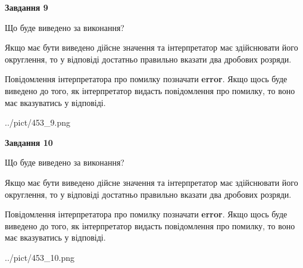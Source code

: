 \documentclass[12pt, ukrainian]{article}
\begin{document}
{\begin {Large}
{\begin {center}\textbf{Завдання 9}\end {center}}\par
Що буде виведено за виконання? \par

Якщо має бути виведено дійсне значення та інтерпретатор має здійснювати його округлення, 
то у відповіді достатньо правильно вказати два дробових розряди.

Повідомлення інтерпретатора про помилку позначати \textbf{error}.
Якщо щось буде виведено до того, як інтерпретатор видасть повідомлення про помилку, 
то воно має вказуватись у відповіді. \par

\begin{center}
	{../pict/453_9.png}
\end{center}
\newpage

{\begin {center}\textbf{Завдання 10}\end {center}}\par
Що буде виведено за виконання? \par

Якщо має бути виведено дійсне значення та інтерпретатор має здійснювати його округлення, 
то у відповіді достатньо правильно вказати два дробових розряди.

Повідомлення інтерпретатора про помилку позначати \textbf{error}.
Якщо щось буде виведено до того, як інтерпретатор видасть повідомлення про помилку, 
то воно має вказуватись у відповіді. \par

\begin{center}
	{../pict/453_10.png}
\end{center}
\newpage

\end {Large}}
\end{document}
